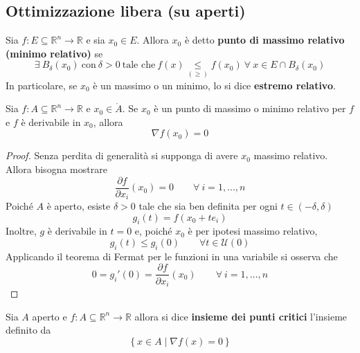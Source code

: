 \subsection{Ottimizzazione libera (su aperti)}
\begin{definition} \label{Def: Max e min relativo}
    Sia $f:E \subseteq \mathbb{R}^n \to \mathbb{R}$ e sia $x_0 \in E$. Allora $x_0$ è detto \textbf{punto di massimo relativo (minimo relativo)} se
    \begin{equation*}
        \exists\ B_\delta(x_0)\ \text{con}\ \delta>0\ \text{tale che}\ f(x) \underset{(\geq)}{\leq} f(x_0)\ \forall\ x \in E \cap B_\delta(x_0)
    \end{equation*}
    In particolare, se $x_0$ è un massimo o un minimo, lo si dice \textbf{estremo relativo}.
\end{definition}
\begin{theorem}
Sia $f:A \subseteq \mathbb{R}^n  \to \mathbb{R}$ e $x_0 \in \mathring{A}$. Se $x_0$ è un punto di massimo o minimo relativo per $f$ e $f$ è derivabile in $x_0$, allora
\begin{equation*}
    \nabla f(x_0)=0
\end{equation*}
\end{theorem}
\begin{proof}
    Senza perdita di generalità si supponga di avere $x_0$ massimo relativo. Allora bisogna mostrare
    \begin{equation*}
        \frac{\partial f}{\partial x_i}(x_0)=0 \qquad \forall\ i=1, \dots, n
    \end{equation*}
    Poiché $A$ è aperto, esiste $\delta>0$ tale che sia ben definita per ogni $t \in (-\delta, \delta)$
    \begin{equation*}
        g_i(t)=f(x_0+t e_i)
    \end{equation*}
    Inoltre, $g$ è derivabile in $t=0$ e, poiché $x_0$ è per ipotesi massimo relativo, 
    \begin{equation*}
        g_i(t) \leq g_i(0)\qquad\forall t \in \mathcal{U}(0)
    \end{equation*}
    Applicando il teorema di Fermat per le funzioni in una variabile si osserva che
    \begin{equation*}
        0=g_i'(0)=\frac{\partial f}{\partial x_i}(x_0)\qquad\forall\ i=1, \dots, n
    \end{equation*}
\end{proof}
\begin{definition} \label{Def: Insieme dei punti critici}
    Sia $A$ aperto e $f: A \subseteq \mathbb{R}^n  \to \mathbb{R}$ allora si dice \textbf{insieme dei punti critici} l'insieme definito da
    \begin{equation*}
        \left\{x\in A \mid \nabla f(x)=0\right\}
    \end{equation*}
\end{definition}

